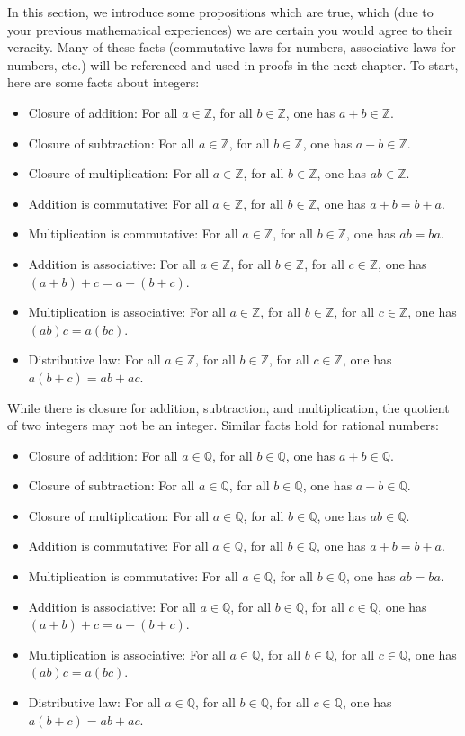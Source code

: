 \documentclass{book}
\theoremstyle{ekimcustom}
\begin{document}
In this section, we introduce some propositions which are true, which (due to your previous mathematical experiences) we are certain you would agree to their veracity. Many of these facts (commutative laws for numbers, associative laws for numbers, etc.) will be referenced and used in proofs in the next chapter. To start, here are some facts about integers:
\begin{itemize}
\item Closure of addition: For all $a \in \mathbb{Z}$, for all $b \in \mathbb{Z}$, one has $a+b \in \mathbb{Z}$.
\item Closure of subtraction: For all $a \in \mathbb{Z}$, for all $b \in \mathbb{Z}$, one has $a-b \in \mathbb{Z}$.
\item Closure of multiplication: For all $a \in \mathbb{Z}$, for all $b \in \mathbb{Z}$, one has $ab \in \mathbb{Z}$.
\item Addition is commutative: For all $a \in \mathbb{Z}$, for all $b \in \mathbb{Z}$, one has $a+b=b+a$.
\item Multiplication is commutative: For all $a \in \mathbb{Z}$, for all $b \in \mathbb{Z}$, one has $ab=ba$.
\item Addition is associative: For all $a \in \mathbb{Z}$, for all $b \in \mathbb{Z}$, for all $c \in \mathbb{Z}$, one has $(a+b)+c=a+(b+c)$.
\item Multiplication is associative: For all $a \in \mathbb{Z}$, for all $b \in \mathbb{Z}$, for all $c \in \mathbb{Z}$, one has $(ab)c=a(bc)$.
\item Distributive law: For all $a \in \mathbb{Z}$, for all $b \in \mathbb{Z}$, for all $c \in \mathbb{Z}$, one has $a(b+c)=ab+ac$.
\end{itemize}
While there is closure for addition, subtraction, and multiplication, the quotient of two integers may not be an integer.
Similar facts hold for rational numbers:
\begin{itemize}
\item Closure of addition: For all $a \in \mathbb{Q}$, for all $b \in \mathbb{Q}$, one has $a+b \in \mathbb{Q}$.
\item Closure of subtraction: For all $a \in \mathbb{Q}$, for all $b \in \mathbb{Q}$, one has $a-b \in \mathbb{Q}$.
\item Closure of multiplication: For all $a \in \mathbb{Q}$, for all $b \in \mathbb{Q}$, one has $ab \in \mathbb{Q}$.
\item Addition is commutative: For all $a \in \mathbb{Q}$, for all $b \in \mathbb{Q}$, one has $a+b=b+a$.
\item Multiplication is commutative: For all $a \in \mathbb{Q}$, for all $b \in \mathbb{Q}$, one has $ab=ba$.
\item Addition is associative: For all $a \in \mathbb{Q}$, for all $b \in \mathbb{Q}$, for all $c \in \mathbb{Q}$, one has $(a+b)+c=a+(b+c)$.
\item Multiplication is associative: For all $a \in \mathbb{Q}$, for all $b \in \mathbb{Q}$, for all $c \in \mathbb{Q}$, one has $(ab)c=a(bc)$.
\item Distributive law: For all $a \in \mathbb{Q}$, for all $b \in \mathbb{Q}$, for all $c \in \mathbb{Q}$, one has $a(b+c)=ab+ac$.
\end{itemize}
\end{document}
